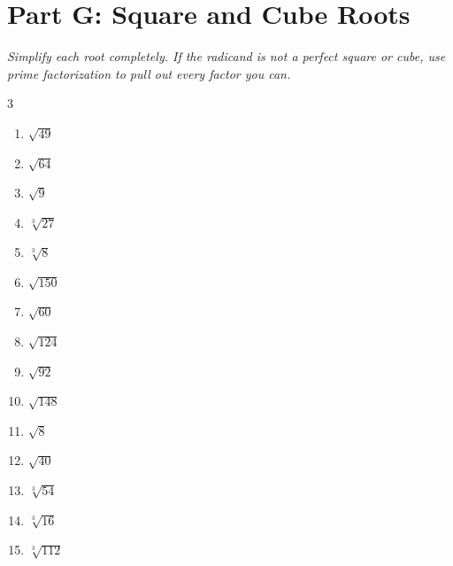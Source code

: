 \documentclass[11pt]{article}
\begin{document}
\section*{Part G: Square and Cube Roots}
\noindent\textit{Simplify each root completely. If the radicand is not a perfect square or cube, use prime factorization to pull out every factor you can.}
\begin{multicols}{3}
\begin{enumerate}
  \item $\sqrt{49}$
  \vspace{1.6cm}
  \item $\sqrt{64}$
  \vspace{1.6cm}
  \item $\sqrt{9}$
  \vspace{1.6cm}
  \item $\sqrt[3]{27}$
  \vspace{1.6cm}
  \item $\sqrt[3]{8}$
  \vspace{1.6cm}
  \item $\sqrt{150}$
  \vspace{1.6cm}
  \item $\sqrt{60}$
  \vspace{1.6cm}
  \item $\sqrt{124}$
  \vspace{1.6cm}
  \item $\sqrt{92}$
  \vspace{1.6cm}
  \item $\sqrt{148}$
  \vspace{1.6cm}
  \item $\sqrt{8}$
  \vspace{1.6cm}
  \item $\sqrt{40}$
  \vspace{1.6cm}
  \item $\sqrt[3]{54}$
  \vspace{1.6cm}
  \item $\sqrt[3]{16}$
  \vspace{1.6cm}
  \item $\sqrt[3]{112}$
  \vspace{1.6cm}
\end{enumerate}
\end{multicols}
\end{document}
